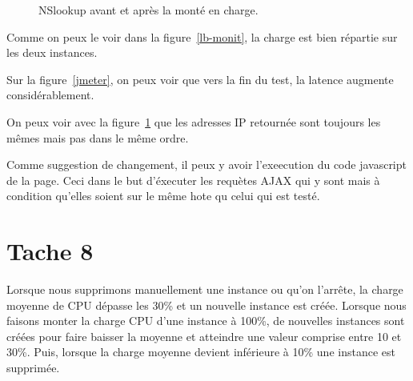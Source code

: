 \documentclass[french,a4paper,11pt]{article}
\begin{document}
    \begin{figure}
        \caption{\label{nslookup}NSlookup avant et après la monté en charge.}
    \end{figure}

    Comme on peux le voir dans la figure~\ref{lb-monit}, la charge est bien répartie sur les deux instances.

    Sur la figure~\ref{jmeter}, on peux voir que vers la fin du test, la latence augmente considérablement.

    On peux voir avec la figure~\ref{nslookup} que les adresses IP retournée sont toujours les mêmes mais pas dans le même ordre.

    Comme suggestion de changement, il peux y avoir l'exeecution du code javascript de la page.
    Ceci dans le but d'éxecuter les requètes AJAX qui y sont mais à condition qu'elles soient sur le même hote qu celui qui est testé.

    \section{Tache 8}\label{sec:task-8}

    Lorsque nous supprimons manuellement une instance ou qu’on l'arrête,
    la charge moyenne de CPU dépasse les 30\% et un nouvelle instance est créée.
    Lorsque nous faisons monter la charge CPU d’une instance à 100\%,
    de nouvelles instances sont créées pour faire baisser la moyenne et atteindre une valeur comprise entre 10 et 30\%.
    Puis, lorsque la charge moyenne devient inférieure à 10\% une instance est supprimée.
\end{document}
